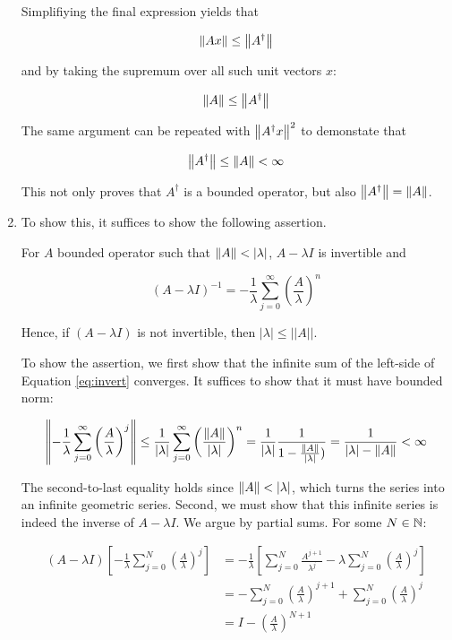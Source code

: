 \documentclass[12pt]{article}%
\begin{document}
\begin{enumerate}[i]
Simplifiying the final expression yields that

\[ \norm{Ax} \leq \norm{A^\dagger} \]

and by taking the supremum over all such unit vectors $x$:

\[ \norm{A} \leq \norm{A^\dagger}\]

The same argument can be repeated with $\norm{A^\dagger x}^2$ to demonstate that

\[ \norm{A^\dagger} \leq \norm{A} < \infty \]

This not only proves that $A^\dagger$ is a bounded operator, but also $ \norm{A^\dagger} = \norm{A}$.

\item

To show this, it suffices to show the following assertion.

For $A$ bounded operator such that $\norm{A} < \abs{\lambda}$, $A - \lambda I$ is invertible and

\begin{equation} \label{eq:invert}
(A - \lambda I)^{-1} = - \frac{1}{\lambda} \sum_{j = 0}^\infty \left(\frac{A}{\lambda}\right)^n
\end{equation}


Hence, if $(A - \lambda I)$ is not invertible, then $|\lambda| \leq ||A||$.

To show the assertion, we first show that the infinite sum of the left-side of Equation \ref{eq:invert} converges. It suffices to show that it must have bounded norm:

\begin{align*}
  \norm{-\frac{1}{\lambda}\sum_{j=0}^\infty \left(\frac{A}{\lambda}\right)^j} \leq \frac{1}{\abs{\lambda}} \sum_{j = 0}^\infty \left(\frac{\norm{A}}{\abs{\lambda}}\right)^n = \frac{1}{|\lambda|}\frac{1}{1 - \frac{\norm{A}}{\abs{\lambda}})} = \frac{1}{\abs{\lambda} - \norm{A}} < \infty
\end{align*}

The second-to-last equality holds since $\norm{A} < \abs{\lambda}$, which turns the series into an infinite geometric series. Second, we must show that this infinite series is indeed the inverse of $A - \lambda I$. We argue by partial sums. For some $N \in \mathbb{N}$:

\begin{align*}
  (A - \lambda I)\left[-\frac{1}{\lambda}\sum_{j = 0}^N \left( \frac{A}{\lambda}\right)^j \right] & = - \frac{1}{\lambda}\left[ \sum_{j =0}^N \frac{A^{j+1}}{\lambda^j} - \lambda\sum_{j =0}^N \left(\frac{A}{\lambda}\right)^j \right] \\
  & = - \sum_{j =0}^N \left(\frac{A}{\lambda}\right)^{j+1} + \sum_{j =0}^N \left(\frac{A}{\lambda}\right)^j \\
  & = I - \left(\frac{A}{\lambda}\right)^{N+1}
\end{align*}


\end{enumerate}
\end{document}
